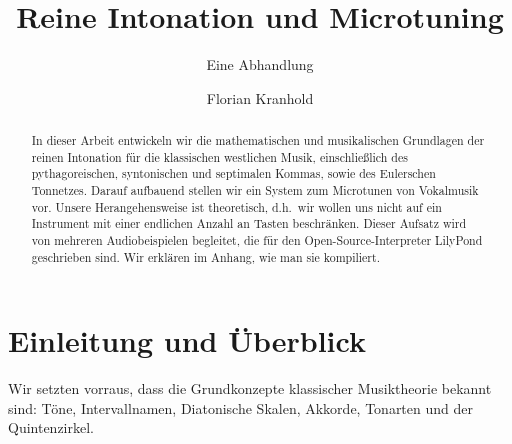 \documentclass[british,11pt]{scrartcl}
\title     {Reine Intonation und Microtuning}
\author    {Florian Kranhold}
\subtitle  {Eine Abhandlung}
\begin{document}
\maketitle

\begin{abstract}
  In dieser Arbeit entwickeln wir die mathematischen und musikalischen
  Grundlagen  der reinen Intonation für die klassischen westlichen Musik,
  einschließlich des pythagoreischen, syntonischen und septimalen Kommas, sowie
  des Eulerschen Tonnetzes. Darauf aufbauend stellen wir ein System zum
  Microtunen von Vokalmusik vor. Unsere Herangehensweise ist theoretisch,
  d.h.\ wir wollen uns nicht auf ein Instrument mit einer endlichen Anzahl an
  Tasten beschränken. Dieser Aufsatz wird von mehreren Audiobeispielen
  begleitet, die für den Open-Source-Interpreter LilyPond geschrieben sind. Wir
  erklären im Anhang, wie man sie kompiliert.
\end{abstract}

\section{Einleitung und Überblick}
\label{sec:int}

Wir setzten vorraus, dass die Grundkonzepte klassischer
Musiktheorie bekannt sind: Töne, Intervallnamen, Diatonische Skalen, Akkorde,
Tonarten und der Quintenzirkel.
\end{document}
